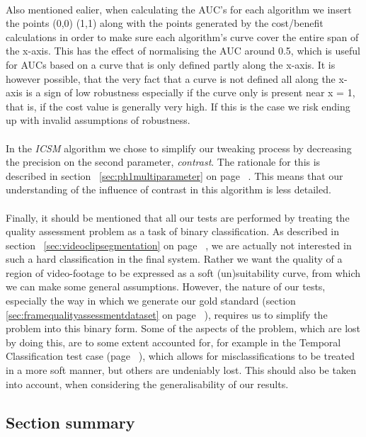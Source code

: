 \\
Also mentioned ealier, when calculating the AUC's for each algorithm we insert the points (0,0) (1,1) along with the points generated by the cost/benefit calculations in order to make sure each algorithm's curve cover the entire span of the x-axis. This has the effect of normalising the AUC around 0.5, which is useful for AUCs based on a curve that is only defined partly along the x-axis. It is however possible, that the very fact that a curve is not defined all along the x-axis is a sign of low robustness especially if the curve only is present near x = 1, that is, if the cost value is generally very high. If this is the case we risk ending up with invalid assumptions of robustness.\\
\\
In the \textit{ICSM} algorithm we chose to simplify our tweaking process by decreasing the precision on the second parameter, \textit{contrast}. The rationale for this is described in section~ \ref{sec:ph1multiparameter} on page ~\pageref{sec:ph1multiparameter}. This means that our understanding of the influence of contrast in this algorithm is less detailed.\\
\\
Finally, it should be mentioned that all our tests are performed by treating the quality assessment problem as a task of binary classification. As described in section~ \ref{sec:videoclipsegmentation} on page ~\pageref{sec:videoclipsegmentation}, we are actually not interested in such a hard classification in the final system. Rather we want the quality of a region of video-footage to be expressed as a soft (un)suitability curve, from which we can make some general assumptions. However, the nature of our tests, especially the way in which we generate our gold standard (section~ \ref{sec:framequalityassessmentdataset} on page ~\pageref{sec:framequalityassessmentdataset}), requires us to simplify the problem into this binary form. Some of the aspects of the problem, which are lost by doing this, are to some extent accounted for, for example in the Temporal Classification test case (page ~\pageref{sec:tctestcase}), which allows for misclassifications to be treated in a more soft manner, but others are undeniably lost. This should also be taken into account, when considering the generalisability of our results.
%
\subsection{Section summary}
%